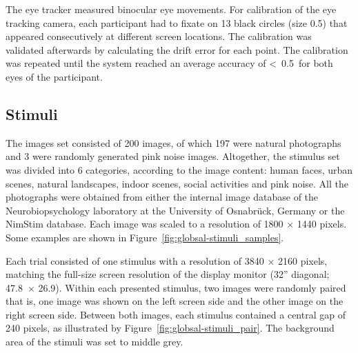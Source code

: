 {The eye tracker measured binocular eye movements. For calibration of the eye tracking camera, each participant had to fixate on 13 black circles (size 0.5\textdegree) that appeared consecutively at different screen locations. The calibration was validated afterwards by calculating the drift error for each point. The calibration was repeated until the system reached an average accuracy of \textless~0.5\textdegree\ for both eyes of the participant.

\subsection{Stimuli}
\label{sec:globsal-methods_stimuli}
The images set consisted of 200 images, of which 197 were natural photographs and 3 were randomly generated pink noise images. Altogether, the stimulus set was divided into 6 categories, according to the image content: human faces, urban scenes, natural landscapes, indoor scenes, social activities and pink noise. All the photographs were obtained from either the internal image database of the Neurobiopsychology laboratory at the University of Osnabr\"uck, Germany or the NimStim database. Each image was scaled to a resolution of 1800 $\times$ 1440 pixels. Some examples are shown in Figure~\ref{fig:globsal-stimuli_samples}.

Each trial consisted of one stimulus with a resolution of 3840 $\times$ 2160 pixels, matching the full-size screen resolution of the display monitor (32'' diagonal; 47.8\textdegree\ $\times$ 26.9\textdegree). Within each presented stimulus, two images were randomly paired that is, one image was shown on the left screen side and the other image on the right screen side. Between both images, each stimulus contained a central gap of 240 pixels, as illustrated by Figure~\ref{fig:globsal-stimuli_pair}. The background area of the stimuli was set to middle grey.

}
